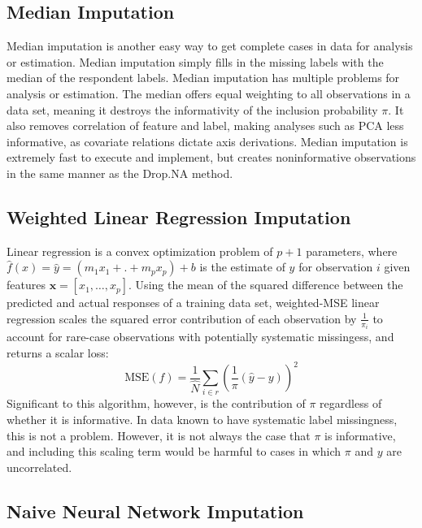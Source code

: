 \documentclass[12pt,twoside]{reedthesis}
\begin{document}
\subsection{Median Imputation}\label{median-imputation}

Median imputation is another easy way to get complete cases in data for
analysis or estimation. Median imputation simply fills in the missing
labels with the median of the respondent labels. Median imputation has
multiple problems for analysis or estimation. The median offers equal
weighting to all observations in a data set, meaning it destroys the
informativity of the inclusion probability \(\pi\). It also removes
correlation of feature and label, making analyses such as PCA less
informative, as covariate relations dictate axis derivations. Median
imputation is extremely fast to execute and implement, but creates
noninformative observations in the same manner as the Drop.NA method.

\subsection{Weighted Linear Regression Imputation}\label{sec:linear_reg}

Linear regression is a convex optimization problem of \(p+1\)
parameters, where \(\hat f(x) = \hat y = (m_1x_1 + .+ m_px_p)+b\) is the
estimate of \(y\) for observation \(i\) given features
\(\boldsymbol{x} = [x_1, \dots ,x_p]\). Using the mean of the squared
difference between the predicted and actual responses of a training data
set, weighted-MSE linear regression scales the squared error
contribution of each observation by \(\frac{1}{\pi_i}\) to account for
rare-case observations with potentially systematic missingess, and
returns a scalar loss: \[
\text{MSE}(f) = \frac{1}{\hat N} \sum_{i \in r} (\frac{1}{\pi}(\hat{y} - y))^2 \label{eq:wmse}
\] Significant to this algorithm, however, is the contribution of
\(\pi\) regardless of whether it is informative. In data known to have
systematic label missingness, this is not a problem. However, it is not
always the case that \(\pi\) is informative, and including this scaling
term would be harmful to cases in which \(\pi\) and \(y\) are
uncorrelated.

\subsection{Naive Neural Network
Imputation}\label{naive-neural-network-imputation}
\end{document}
